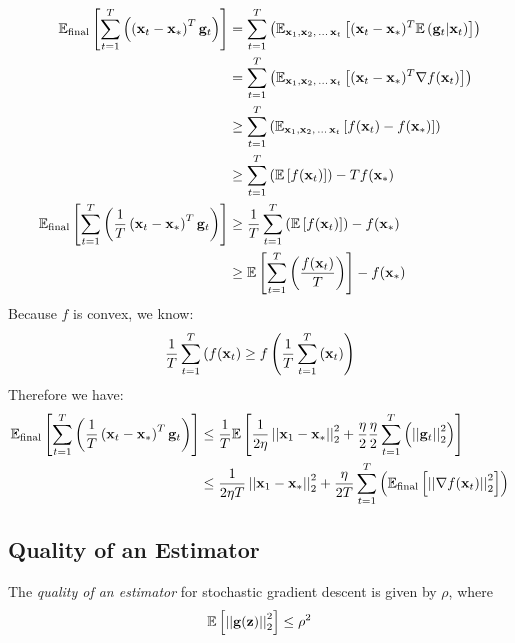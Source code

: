 \documentclass[11pt]{article}
\newcommand{\ltnorm} [1] {
  \left| \left| #1 \right| \right|_{2}
}
\begin{document}
\begin{align*}
\mathbb{E}_{\text{final}} \left[ \sum_{t = 1}^{T} \left( \left( {\bf x}_{t} - {\bf x}_{\ast} \right)^{T} {\bf g}_{t} \right) \right] &= \sum_{t = 1}^{T} \left( \mathbb{E}_{{\bf x}_{1}, {\bf x}_{2}, \,...\, {\bf x}_{t}} \left[ ({\bf x}_{t} - {\bf x}_{\ast})^{T} \mathbb{E} \left( {\bf g}_{t} | {\bf x}_{t} \right) \right] \right) \\
&= \sum_{t = 1}^{T} \left( \mathbb{E}_{{\bf x}_{1}, {\bf x}_{2}, \,...\, {\bf x}_{t}} \left[ ({\bf x}_{t} - {\bf x}_{\ast})^{T} \nabla f ( {\bf x}_{t} ) \right] \right) \\
&\geq \sum_{t = 1}^{T} \left( \mathbb{E}_{{\bf x}_{1}, {\bf x}_{2}, \,...\, {\bf x}_{t}} \left[ f({\bf x}_{t}) - f({\bf x}_{\ast}) \right] \right) \\
&\geq \sum_{t = 1}^{T} \left( \mathbb{E} \left[ f({\bf x}_{t}) \right] \right) - T f({\bf x}_{\ast}) \\
\mathbb{E}_{\text{final}} \left[ \sum_{t = 1}^{T} \left( \frac{1}{T} \left( {\bf x}_{t} - {\bf x}_{\ast} \right)^{T} {\bf g}_{t} \right) \right] &\geq \frac{1}{T} \sum_{t = 1}^{T} \left( \mathbb{E} \left[ f({\bf x}_{t}) \right] \right) - f({\bf x}_{\ast}) \\
&\geq  \mathbb{E} \left[ \sum_{t = 1}^{T} \left( \frac{f({\bf x}_{t})}{T} \right) \right] - f({\bf x}_{\ast}) \\
\end{align*}
Because $f$ is convex, we know:
\[ \frac{1}{T} \sum_{t = 1}^{T} \left( f({\bf x}_{t} \right) \geq f\left( \frac{1}{T} \sum_{t = 1}^{T} \left( {\bf x}_{t} \right) \right) \]
Therefore we have:
\begin{align*}
\mathbb{E}_{\text{final}} \left[ \sum_{t = 1}^{T} \left( \frac{1}{T} \left( {\bf x}_{t} - {\bf x}_{\ast} \right)^{T} {\bf g}_{t} \right) \right] &\leq \frac{1}{T} \mathbb{E} \left[ \frac{1}{2 \eta} \ltnorm{{\bf x}_{1} - {\bf x}_{\ast}}^{2} + \frac{\eta}{2} \frac{\eta}{2} \sum_{t = 1}^{T} \left( \ltnorm{{\bf g}_{t}}^{2} \right) \right] \\
&\leq \frac{1}{2 \eta T} \ltnorm{{\bf x}_{1} - {\bf x}_{\ast}}^{2} + \frac{\eta}{2T} \sum_{t = 1}^{T} \left( \mathbb{E}_{\text{final}} \left[ \ltnorm{\nabla f ({\bf x}_{t} )}^{2} \right] \right) \\
\end{align*}

\subsection*{Quality of an Estimator}
The \emph{quality of an estimator} for stochastic gradient descent is given by $\rho$, where
\[ \mathbb{E} \left[ \ltnorm{{\bf g} ({\bf z})}^{2} \right] \leq \rho^{2} \]
\end{document}
